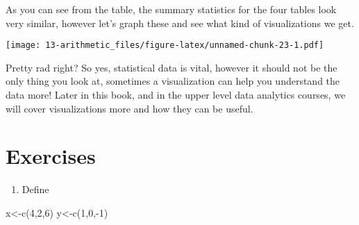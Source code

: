 \documentclass[
]{book}
\newenvironment{Shaded}{\begin{snugshade}}{\end{snugshade}}
\newcommand{\DecValTok}[1]{\textcolor[rgb]{0.00,0.00,0.81}{#1}}
\newcommand{\FunctionTok}[1]{\textcolor[rgb]{0.00,0.00,0.00}{#1}}
\newcommand{\NormalTok}[1]{#1}
\newcommand{\OtherTok}[1]{\textcolor[rgb]{0.56,0.35,0.01}{#1}}
\newcommand{\SpecialCharTok}[1]{\textcolor[rgb]{0.00,0.00,0.00}{#1}}
\providecommand{\tightlist}{%
  \setlength{\itemsep}{0pt}\setlength{\parskip}{0pt}}
\begin{document}
As you can see from the table, the summary statistics for the four tables look very similar, however let's graph these and see what kind of visualizations we get.

\texttt{[image: 13-arithmetic\_files/figure-latex/unnamed-chunk-23-1.pdf]}

Pretty rad right? So yes, statistical data is vital, however it should not be the only thing you look at, sometimes a visualization can help you understand the data more! Later in this book, and in the upper level data analytics courses, we will cover visualizations more and how they can be useful.

\hypertarget{exercises-1}{%
\section{Exercises}\label{exercises-1}}

\begin{enumerate}
\def\labelenumi{\arabic{enumi}.}
\tightlist
\item
  Define
\end{enumerate}

\begin{Shaded}
\begin{Highlighting}[]
\NormalTok{x}\OtherTok{\textless{}{-}}\FunctionTok{c}\NormalTok{(}\DecValTok{4}\NormalTok{,}\DecValTok{2}\NormalTok{,}\DecValTok{6}\NormalTok{)}
\NormalTok{y}\OtherTok{\textless{}{-}}\FunctionTok{c}\NormalTok{(}\DecValTok{1}\NormalTok{,}\DecValTok{0}\NormalTok{,}\SpecialCharTok{{-}}\DecValTok{1}\NormalTok{)}
\end{Highlighting}
\end{Shaded}
\end{document}
